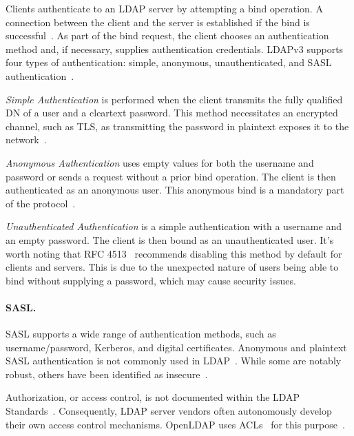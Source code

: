 Clients authenticate to an LDAP server by attempting a bind operation. A connection between the client and the server is established if the bind is successful~\cite{rfc4511, LDAP_RFC_AUTHENTICATION}. As part of the bind request, the client chooses an authentication method and, if necessary, supplies authentication credentials. LDAPv3 supports four types of authentication: simple, anonymous, unauthenticated, and SASL authentication~\cite{LDAP_RFC_AUTHENTICATION}. 

\textit{Simple Authentication} is performed when the client transmits the fully qualified DN of a user and a cleartext password. This method necessitates an encrypted channel, such as TLS, as transmitting the password in plaintext exposes it to the network~\cite{LDAP_RFC_AUTHENTICATION}.

\textit{Anonymous Authentication} uses empty values for both the username and password or sends a request without a prior bind operation. The client is then authenticated as an anonymous user. This anonymous bind is a mandatory part of the protocol~\cite{LDAP_RFC_AUTHENTICATION}.

\textit{Unauthenticated Authentication} is a simple authentication with a username and an empty password. The client is then bound as an unauthenticated user. It's worth noting that RFC 4513~\cite{LDAP_RFC_AUTHENTICATION} recommends disabling this method by default for clients and servers. This is due to the unexpected nature of users being able to bind without supplying a password, which may cause security issues. 

\paragraph{SASL.} SASL supports a wide range of authentication methods, such as username/password, Kerberos, and digital certificates. Anonymous and plaintext SASL authentication is not commonly used in LDAP~\cite{rfc4513}. While some are notably robust, others have been identified as insecure~\cite{RFC4422SASL}. 

Authorization, or access control, is not documented within the LDAP Standards~\cite{rfc4511}. Consequently, \gls{LDAP} server vendors often autonomously develop their own access control mechanisms. OpenLDAP uses \glspl{ACL}~\cite{alvinashcraftAccessControlLists2023, newellIntroductionLinuxAccess2020} for this purpose~\cite{OpenLDAPSoftwareAdministrator}.

